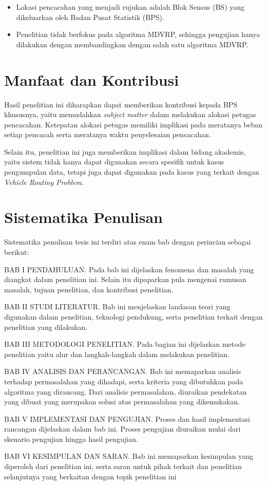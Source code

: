 \begin{itemize}
\item Lokasi pencacahan yang menjadi rujukan adalah Blok Sensus (BS) yang dikeluarkan oleh Badan Pusat Statistik (BPS).
\item Penelitian tidak berfokus pada algoritma MDVRP, sehingga pengujian hanya dilakukan dengan membandingkan dengan salah satu algoritma MDVRP.
\end{itemize}


\section{Manfaat dan Kontribusi}
Hasil penelitian ini diharapkan dapat memberikan kontribusi kepada BPS khususnya, yaitu memudahkan \textit{subject matter} dalam melakukan alokasi petugas pencacahan. Ketepatan alokasi petugas memiliki implikasi pada meratanya beban setiap pencacah serta meratanya waktu penyelesaian pencacahan.


Selain itu, penelitian ini juga memberikan implikasi dalam bidang akademis, yaitu sistem tidak hanya dapat digunakan secara spesifik untuk kasus pengumpulan data, tetapi juga dapat digunakan pada kasus yang terkait dengan \textit{Vehicle Routing Problem}.


\section{Sistematika Penulisan}
Sistematika penulisan tesis ini terdiri atas enam bab dengan perincian sebagai berikut:


BAB I PENDAHULUAN. Pada bab ini dijelaskan fenomena dan masalah yang diangkat dalam penelitian ini. Selain itu dipaparkan pula mengenai rumusan masalah, tujuan penelitian, dan kontribusi penelitian.


BAB II STUDI LITERATUR. Bab ini menjelaskan landasan teori yang digunakan dalam penelitian, teknologi pendukung, serta penelitian terkait dengan penelitian yang dilakukan.


BAB III METODOLOGI PENELITIAN. Pada bagian ini dijelaskan metode penelitian yaitu alur dan langkah-langkah dalam melakukan penelitian.


BAB IV ANALISIS DAN PERANCANGAN. Bab ini memaparkan analisis terhadap permasalahan yang dihadapi, serta kriteria yang dibutuhkan pada algoritma yang dirancang. Dari analisis permasalahan, diuraikan pendekatan yang dibuat yang merupakan solusi atas permasalahan yang dikemukakan.


BAB V IMPLEMENTASI DAN PENGUJIAN. Proses dan hasil implementasi rancangan dijelaskan dalam bab ini. Proses pengujian diuraikan mulai dari skenario pengujian hingga hasil pengujian.


BAB VI KESIMPULAN DAN SARAN. Bab ini memaparkan kesimpulan yang diperoleh dari penelitian ini, serta saran untuk pihak terkait dan penelitian selanjutnya yang berkaitan dengan topik penelitian ini
